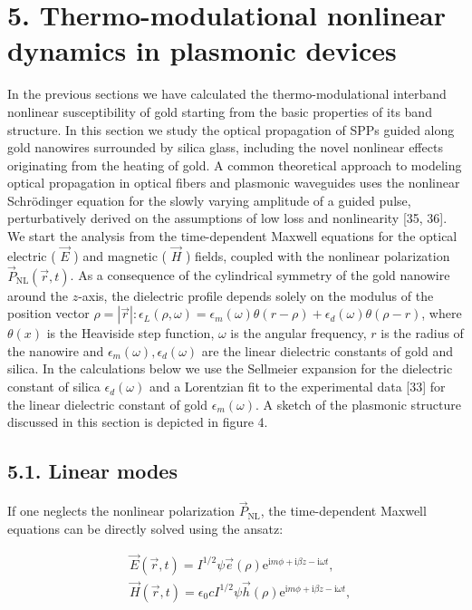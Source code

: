 \documentclass[10pt]{article}
\begin{document}
\section*{5. Thermo-modulational nonlinear dynamics in plasmonic devices}
In the previous sections we have calculated the thermo-modulational interband nonlinear susceptibility of gold starting from the basic properties of its band structure. In this section we study the optical propagation of SPPs guided along gold nanowires surrounded by silica glass, including the novel nonlinear effects originating from the heating of gold. A common theoretical approach to modeling optical propagation in optical fibers and plasmonic waveguides uses the nonlinear Schrödinger equation for the slowly varying amplitude of a guided pulse, perturbatively derived on the assumptions of low loss and nonlinearity [35, 36]. We start the analysis from the time-dependent Maxwell equations for the optical electric ( $\vec{E}$ ) and magnetic ( $\vec{H}$ ) fields, coupled with the nonlinear polarization $\vec{P}_{\mathrm{NL}}(\vec{r}, t)$. As a consequence of the cylindrical symmetry of the gold nanowire around the $z$-axis, the dielectric profile depends solely on the modulus of the position vector $\rho=|\vec{r}|: \epsilon_{L}(\rho, \omega)=\epsilon_{m}(\omega) \theta(r-\rho) +\epsilon_{d}(\omega) \theta(\rho-r)$, where $\theta(x)$ is the Heaviside step function, $\omega$ is the angular frequency, $r$ is the radius of the nanowire and $\epsilon_{m}(\omega), \epsilon_{d}(\omega)$ are the linear dielectric constants of gold and silica. In the calculations below we use the Sellmeier expansion for the dielectric constant of silica $\epsilon_{d}(\omega)$ and a Lorentzian fit to the experimental data [33] for the linear dielectric constant of gold $\epsilon_{m}(\omega)$. A sketch of the plasmonic structure discussed in this section is depicted in figure 4.

\subsection*{5.1. Linear modes}
If one neglects the nonlinear polarization $\vec{P}_{\mathrm{NL}}$, the time-dependent Maxwell equations can be directly solved using the ansatz:


\begin{align*}
& \vec{E}(\vec{r}, t)=I^{1 / 2} \psi \vec{e}(\rho) \mathrm{e}^{\mathrm{i} m \phi+\mathrm{i} \beta z-\mathrm{i} \omega t},  \tag{13}\\
& \vec{H}(\vec{r}, t)=\epsilon_{0} c I^{1 / 2} \psi \vec{h}(\rho) \mathrm{e}^{\mathrm{i} m \phi+\mathrm{i} \beta z-\mathrm{i} \omega t}, \tag{14}
\end{align*}
\end{document}
